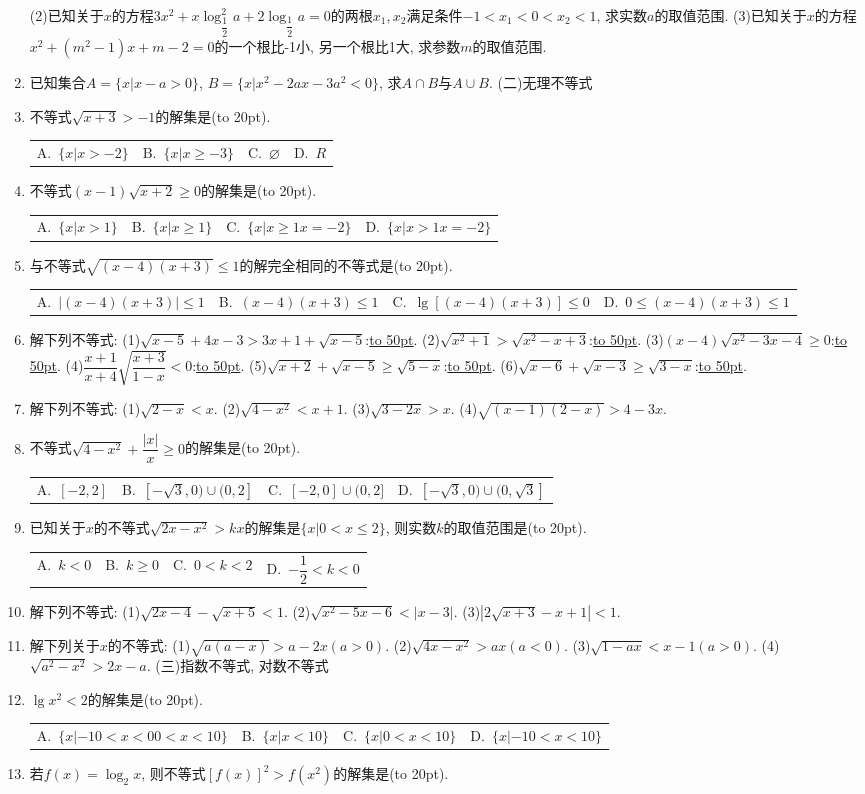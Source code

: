 \documentclass[10pt,a4paper]{article}
\newcommand{\blank}[1]{\underline{\hbox to #1pt{}}}
\newcommand{\bracket}[1]{(\hbox to #1pt{})}
\newcommand{\fourch}[4]{\par\begin{tabular}{p{.23\textwidth}p{.23\textwidth}p{.23\textwidth}p{.23\textwidth}}
A.~#1 &B.~#2& C.~#3& D.~#4
\end{tabular}}
\begin{document}
\begin{enumerate}[1.]
    (2)已知关于$x$的方程$3{x^2}+x\log _{\dfrac 12}^2a+2{\log_{\dfrac 12}}a=0$的两根$x_1,x_2$满足条件$-1<{x_1}<0<{x_2}<1$, 求实数$a$的取值范围.
    (3)已知关于$x$的方程$x^2+(m^2-1)x+m-2=0$的一个根比-1小, 另一个根比1大, 求参数$m$的取值范围.
    \item 已知集合$A=\{x|x-a >0\}$, $B=\{x|x^2-2ax-3a^2<0\}$, 求$A\cap B$与$A\cup B$.
    (二)无理不等式
    \item 不等式$\sqrt{x+3}>-1$的解集是\bracket{20}.
    \fourch{$\{x|x>-2\}$}{$\{x|x\ge -3\}$}{$\varnothing$}{$R$}
    \item 不等式$(x-1)\sqrt{x+2}\ge 0$的解集是\bracket{20}.
    \fourch{$\{x|x>1\}$}{$\{x|x\ge 1\}$}{$\{x|x\ge 1x=-2\}$}{$\{x|x>1x=-2\}$}
    \item 与不等式$\sqrt{(x-4)(x+3)}\le 1$的解完全相同的不等式是\bracket{20}.
    \fourch{$|(x-4)(x+3)|\le 1$}{$(x-4)(x+3)\le 1$}{$\lg [ (x-4)(x+3) ]\le 0$}{$0\le (x-4)(x+3)\le 1$}
    \item 解下列不等式:
    (1)$\sqrt{x-5}+4x-3>3x+1+\sqrt{x-5}$:\blank{50}.
    (2)$\sqrt{{x^2}+1}>\sqrt{{x^2}-x+3}$:\blank{50}.
    (3)$(x-4)\sqrt{{x^2}-3x-4}\ge 0$:\blank{50}.
    (4)$\dfrac{x+1}{x+4}\sqrt{\dfrac{x+3}{1-x}}<0$:\blank{50}.
    (5)$\sqrt{x+2}+\sqrt{x-5}\ge \sqrt{5-x}$:\blank{50}.
    (6)$\sqrt{x-6}+\sqrt{x-3}\ge \sqrt{3-x}$:\blank{50}.
    \item 解下列不等式:
    (1)$\sqrt{2-x}<x$.					(2)$\sqrt{4-{x^2}}<x+1$.
    (3)$\sqrt{3-2x}>x$.				(4)$\sqrt{(x-1)(2-x)}>4-3x$.
    \item 不等式$\sqrt{4-{x^2}}+\dfrac{|x|}x\ge 0$的解集是\bracket{20}.
    \fourch{$[ -2,2 ]$}{$[ -\sqrt 3,0)\cup (0,2 ]$}{$[ -2,0 ]\cup (0,2 ]$}{$[ -\sqrt 3,0)\cup (0,\sqrt 3 ]$}
    \item 已知关于$x$的不等式$\sqrt{2x-{x^2}}>kx$的解集是$\{x|0<x\le 2\}$, 则实数$k$的取值范围是\bracket{20}.
    \fourch{$k<0$}{$k\ge 0$}{$0<k<2$}{$-\dfrac 12<k<0$}
    \item 解下列不等式:
    (1)$\sqrt{2x-4}-\sqrt{x+5}<1$.				(2)$\sqrt{{x^2}-5x-6}<|x-3|$.
    (3)$|2\sqrt{x+3}-x+1|<1$.
    \item 解下列关于$x$的不等式:
    (1)$\sqrt{a(a-x)}>a-2x(a>0)$.				(2)$\sqrt{4x-{x^2}}>ax(a<0)$.
    (3)$\sqrt{1-ax}<x-1(a>0)$.					(4)$\sqrt{{a^2}-{x^2}}>2x-a$.
    (三)指数不等式, 对数不等式
    \item $\lg x^2<2$的解集是\bracket{20}.
    \fourch{$\{x|-10<x<00<x<10\}$}{$\{x|x<10\}$}{$\{x|0<x<10\}$}{$\{x|-10<x<10\}$}
    \item 若$f(x)=\log_2x$, 则不等式${{[ f(x) ]}^2}>f(x^2)$的解集是\bracket{20}.

\end{enumerate}
\end{document}

